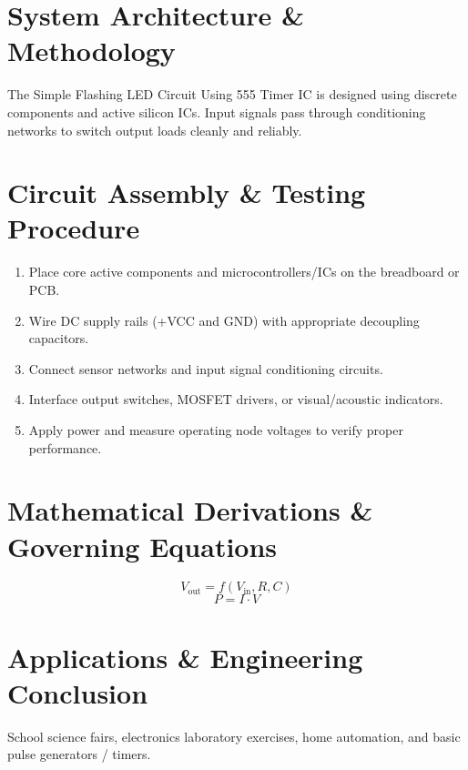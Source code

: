 \documentclass[11pt,a4paper]{article}
\begin{document}
\section{System Architecture \& Methodology}
The Simple Flashing LED Circuit Using 555 Timer IC is designed using discrete components and active silicon ICs. Input signals pass through conditioning networks to switch output loads cleanly and reliably.

\section{Circuit Assembly \& Testing Procedure}
\begin{enumerate}
    \item Place core active components and microcontrollers/ICs on the breadboard or PCB.
    \item Wire DC supply rails (+VCC and GND) with appropriate decoupling capacitors.
    \item Connect sensor networks and input signal conditioning circuits.
    \item Interface output switches, MOSFET drivers, or visual/acoustic indicators.
    \item Apply power and measure operating node voltages to verify proper performance.
\end{enumerate}

\section{Mathematical Derivations \& Governing Equations}
\begin{equation}
V_{\text{out}} = f(V_{\text{in}}, R, C)
\end{equation}
\begin{equation}
P = I \cdot V
\end{equation}

\section{Applications \& Engineering Conclusion}
School science fairs, electronics laboratory exercises, home automation, and basic pulse generators / timers.
\end{document}
